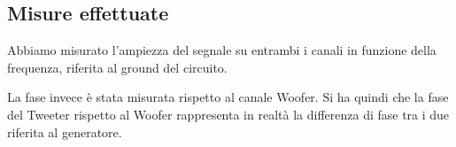 \documentclass[../Relazione_circuiti]{subfiles}
\begin{document}
\subsection{Misure effettuate}
  Abbiamo misurato l'ampiezza del segnale su entrambi i canali in funzione della frequenza, riferita al ground del circuito.

  La fase invece è stata misurata rispetto al canale Woofer. Si ha quindi che la fase del Tweeter rispetto al Woofer
  rappresenta in realtà la differenza di fase tra i due riferita al generatore.
\end{document}
